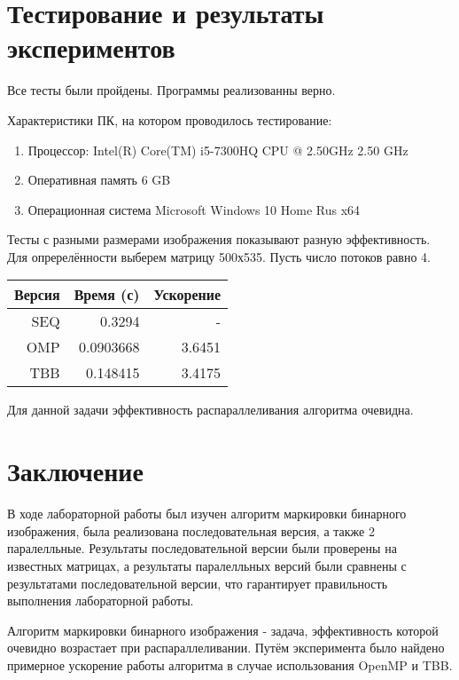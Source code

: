 \documentclass{report}
\begin{document}
\section*{Тестирование и результаты экспериментов}
Все тесты были пройдены. Программы реализованны верно.
\par Характеристики ПК, на котором проводилось тестирование:
\begin{enumerate}
    \item Процессор: Intel(R) Core(TM) i5-7300HQ CPU @ 2.50GHz   2.50 GHz
    \item Оперативная память 6 GB
    \item Операционная система Microsoft Windows 10 Home Rus x64
\end{enumerate}
\par Тесты с разными размерами изображения показывают разную эффективность. Для опререлённости выберем матрицу 500х535.
Пусть число потоков равно 4.
\begin{table}[!h]
\centering
\begin{tabular}{| r | r | r |}
\hline
Версия & Время (с) & Ускорение \\[5pt]
\hline
SEQ & 0.3294 & -     \\
OMP & 0.0903668 & 3.6451 \\
TBB & 0.148415 & 3.4175 \\
\hline
\end{tabular}
\end{table}
\par Для данной задачи эффективность распараллеливания алгоритма очевидна.

\newpage
\section*{Заключение}
В ходе лабораторной работы был изучен алгоритм маркировки бинарного изображения, была реализована последовательная версия, а также 2 паралелльные. Результаты последовательной версии были проверены на известных матрицах, а результаты паралелльных версий были сравнены с результатами последовательной версии, что гарантирует правильность выполнения лабораторной работы.
\par Алгоритм маркировки бинарного изображения - задача, эффективность которой очевидно возрастает при распараллеливании. Путём эксперимента было найдено примерное ускорение работы алгоритма в случае использования OpenMP и TBB.
\end{document}
